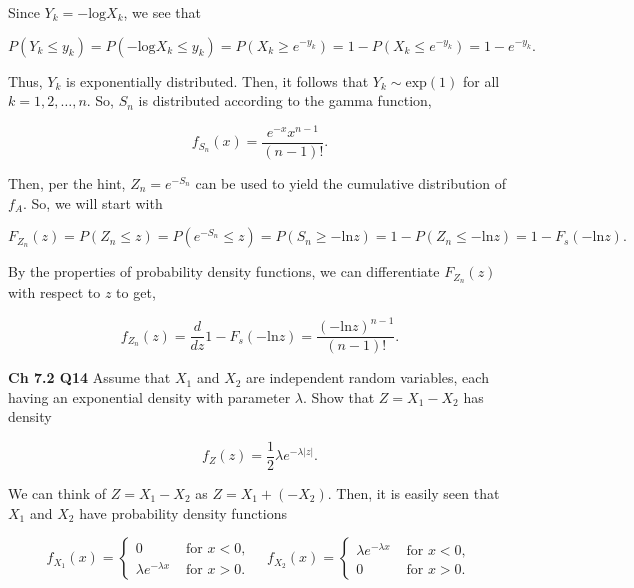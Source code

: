 \documentclass[12pt]{article}
\begin{document}
\vspace*{.5cm}
\noindent
Since $Y_k = - \text{log} X_k$, we see that 

\begin{equation*}
P(Y_k \leq y_k) = P(- \text{log} X_k \leq y_k) = P(X_k \geq e^{- y_k}) = 1 - P(X_k \leq e^{- y_k}) = 1 - e^{- y_k}.
\end{equation*}

\noindent
Thus, $Y_k$ is exponentially distributed. Then, it follows that $Y_k \sim \text{exp}(1)$ for all $k = 1, 2, \ldots, n$. So, $S_n$ is distributed according to the gamma function,

\begin{equation*}
f_{S_n}(x) = \frac{e^{- x } x^{n-1}}{\left(n-1\right)!}.
\end{equation*} 

\noindent
Then, per the hint, $Z_n = e^{−S_n}$ can be used to yield the cumulative distribution of $f_A$. So, we will start with 

\begin{equation*}
F_{Z_n}(z) = P(Z_n \leq z) = P(e^{- S_n} \leq z) = P(S_n \geq - \text{ln} z) = 1 - P(Z_n \leq - \text{ln} z) = 1 - F_s(- \text{ln} z).
\end{equation*}

\noindent
By the properties of probability density functions, we can differentiate $F_{Z_n}(z)$ with respect to $z$ to get,

\begin{equation*}
f_{Z_n}(z) = \frac{d}{dz} 1 - F_s(- \text{ln} z) = \frac{(- \text{ln} z)^{n-1}}{ \left(n-1\right)!}.
\end{equation*}


\vspace*{.5cm}
\noindent
\textbf{Ch 7.2 Q14} Assume that $X_1$ and $X_2$ are independent random variables, each having an exponential density with parameter $\lambda$. Show that $Z = X_1 - X_2$ has density

\begin{equation*}
f_Z(z) = \frac{1}{2} \lambda e^{- \lambda \lvert z \rvert}.
\end{equation*}

\noindent
We can think of $Z = X_1 - X_2$ as $Z = X_1 + (-X_2)$. Then, it is easily seen that $X_1$ and $X_2$ have probability density functions

\begin{equation*}
f_{X_1}(x) = \begin{cases}
             0  & \text{ for } x < 0, \\
             \lambda e^{- \lambda x}  & \text{ for } x > 0.
       \end{cases} \quad
f_{X_2}(x) = \begin{cases}
		      \lambda e^{- \lambda x}  & \text{ for } x < 0, \\
             0  & \text{ for } x > 0.
       \end{cases}
\end{equation*}
\end{document}
